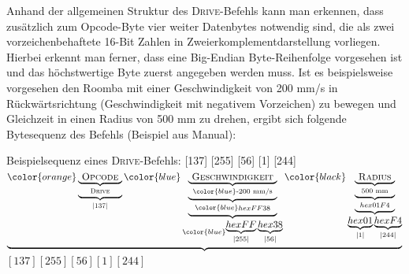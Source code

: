 Anhand der allgemeinen Struktur des \textsc{Drive}-Befehls kann man erkennen, dass zusätzlich zum Opcode-Byte vier weiter Datenbytes notwendig sind, die als zwei vorzeichenbehaftete 16-Bit Zahlen in Zweierkomplementdarstellung vorliegen. Hierbei erkennt man ferner, dass eine Big-Endian Byte-Reihenfolge vorgesehen ist und das höchstwertige Byte zuerst angegeben werden muss. Ist es beispielsweise vorgesehen den Roomba mit einer Geschwindigkeit von 200 mm/s in Rückwärtsrichtung (Geschwindigkeit mit negativem Vorzeichen) zu bewegen und Gleichzeit in einen Radius von 500 mm zu drehen, ergibt sich folgende Bytesequenz des Befehls (Beispiel aus Manual):
\begin{beispiel}{Beispielsequenz eines \textsc{Drive}-Befehls: [137] [255] [56] [1] [244]} \\
\centering
\(
\underbrace{\color{orange}\underbrace{\underbrace{\text{\textsc{ Opcode }}}_{\substack{\text{\textsc{Drive}}}}}_{\substack{\text{\textsc{|137|}}}}
\color{blue}\underbrace{\underbrace{\underbrace{\text{\textsc{ Geschwindigkeit }}}_{\color{blue}\substack{\text{-200 mm/s}}}}_{\color{blue}\substack{hex FF38}}}_{\color{blue}\substack{\underbrace{hex FF}_{\substack{|255|}}\underbrace{hex 38}_{\substack{|56|}}}}\color{black}\underbrace{\underbrace{\underbrace{\text{\textsc{ Radius }}}_{\substack{\text{500 mm}}}}_{\substack{hex 01F4}}}_{\substack{\underbrace{hex 01}_{\substack{|1|}}\underbrace{hex F4}_{\substack{|244|}}}}} \)\\
\( [137] [255] [56] [1] [244] \)

\label{exa:drive}
\end{beispiel}

